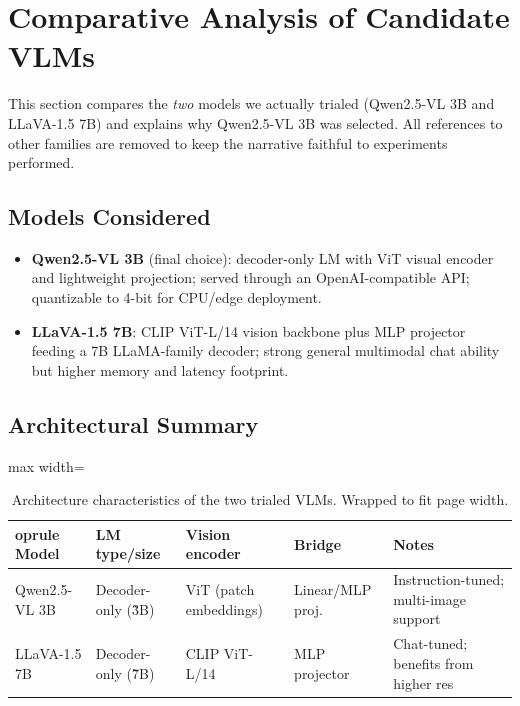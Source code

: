\documentclass[11pt,a4paper]{article}
\begin{document}
\section{Comparative Analysis of Candidate VLMs}
This section compares the \emph{two} models we actually trialed (Qwen2.5-VL 3B and LLaVA-1.5 7B) and explains why Qwen2.5-VL 3B was selected. All references to other families are removed to keep the narrative faithful to experiments performed.

\subsection{Models Considered}
\begin{itemize}[leftmargin=*]
    \item \textbf{Qwen2.5-VL 3B} (final choice): decoder-only LM with ViT visual encoder and lightweight projection; served through an OpenAI-compatible API; quantizable to 4-bit for CPU/edge deployment.
    \item \textbf{LLaVA-1.5 7B}: CLIP ViT-L/14 vision backbone plus MLP projector feeding a 7B LLaMA-family decoder; strong general multimodal chat ability but higher memory and latency footprint.
\end{itemize}

\subsection{Architectural Summary}
\begin{table}[h]
\centering
\small
\begin{adjustbox}{max width=\textwidth}
\begin{tabular}{l l l l l}
    	oprule
Model & LM type/size & Vision encoder & Bridge & Notes \\
\midrule
Qwen2.5-VL 3B & Decoder-only (\~3B) & ViT (patch embeddings) & Linear/MLP proj. & Instruction-tuned; multi-image support \\
LLaVA-1.5 7B & Decoder-only (\~7B) & CLIP ViT-L/14 & MLP projector & Chat-tuned; benefits from higher res \\
\bottomrule
\end{tabular}
\end{adjustbox}
\caption{Architecture characteristics of the two trialed VLMs. Wrapped to fit page width.}
\label{tab:vlm-arch}
\end{table}
\end{document}
